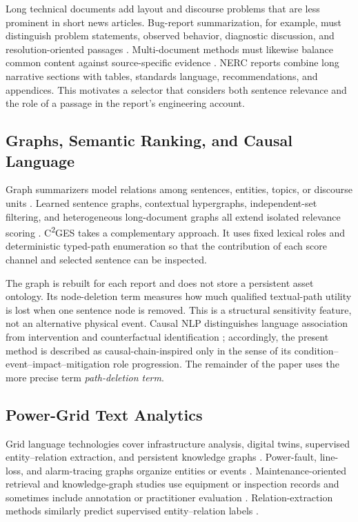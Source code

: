 \documentclass[applsci,article,submit,moreauthors]{Definitions/mdpi}
\newcommand{\cges}{C\textsuperscript{2}GES}
\begin{document}
Long technical documents add layout and discourse problems that are less prominent in short news articles. Bug-report summarization, for example, must distinguish problem statements, observed behavior, diagnostic discussion, and resolution-oriented passages \cite{koh2022bugreport}. Multi-document methods must likewise balance common content against source-specific evidence \cite{zhang2024tomds}. NERC reports combine long narrative sections with tables, standards language, recommendations, and appendices. This motivates a selector that considers both sentence relevance and the role of a passage in the report's engineering account.

\subsection{Graphs, Semantic Ranking, and Causal Language}

Graph summarizers model relations among sentences, entities, topics, or discourse units \cite{wang2020heterogeneous,cui2020enhancing,jing2021multiplex}. Learned sentence graphs, contextual hypergraphs, independent-set filtering, and heterogeneous long-document graphs all extend isolated relevance scoring \cite{siragusa2022sentencegraph,onan2024mches,hark2025mis,bugueno2025graphlss}. \cges{} takes a complementary approach. It uses fixed lexical roles and deterministic typed-path enumeration so that the contribution of each score channel and selected sentence can be inspected.

The graph is rebuilt for each report and does not store a persistent asset ontology. Its node-deletion term measures how much qualified textual-path utility is lost when one sentence node is removed. This is a structural sensitivity feature, not an alternative physical event. Causal NLP distinguishes language association from intervention and counterfactual identification \cite{feder2022causal,du2022ecare}; accordingly, the present method is described as causal-chain-inspired only in the sense of its condition--event--impact--mitigation role progression. The remainder of the paper uses the more precise term \emph{path-deletion term}.

\subsection{Power-Grid Text Analytics}

Grid language technologies cover infrastructure analysis, digital twins, supervised entity--relation extraction, and persistent knowledge graphs \cite{xie2022massively,hamann2024foundation,madabhushi2023survey,srinivasan2023artificial,ranawaka2024leveraging,meng2023gridfield}. Power-fault, line-loss, and alarm-tracing graphs organize entities or events \cite{liu2022powerfault,li2024lineloss,ma2025alarm}. Maintenance-oriented retrieval and knowledge-graph studies use equipment or inspection records and sometimes include annotation or practitioner evaluation \cite{cao2024coalmaintenance,zgg2026bridge,dimaggio2025predictivemaintenance}. Relation-extraction methods similarly predict supervised entity--relation labels \cite{li2025moere,she2025clear}.
\end{document}
